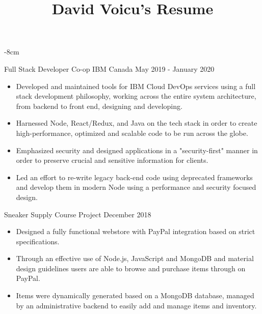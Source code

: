 \documentclass[10pt,a4paper]{altacv}
\begin{document}
\title{David Voicu's Resume}

\begin{adjustwidth}{}{-8cm}
\makecvheader
\end{adjustwidth}


\cvproject
	{Full Stack Developer Co-op}
    {IBM Canada}
    {May 2019 - January 2020}
\begin{itemize}
	\item {Developed and maintained tools for IBM Cloud DevOps services using a full stack development philosophy, working across the entire system architecture, from backend to front end, designing and developing.}
	\item {Harnessed Node, React/Redux, and Java on the tech stack in order to create high-performance, optimized and scalable code to be run across the globe.}
	\item {Emphasized security and designed applications in a "security-first" manner in order to preserve crucial and sensitive information for clients.}
	\item {Led an effort to re-write legacy back-end code using deprecated frameworks and develop them in modern Node using a performance and security focused design.}
\end{itemize}


\cvproject
	{Sneaker Supply}
    {Course Project}
    {December 2018}
\begin{itemize}
	\item {Designed a fully functional webstore with PayPal integration based on strict specifications.}
	\item {Through an effective use of Node.js, JavaScript and MongoDB and material design guidelines users are able to browse and purchase items through on PayPal.}
	\item {Items were dynamically generated based on a MongoDB database, managed by an administrative backend to easily add and manage items and inventory.}
\end{itemize}
\end{document}
